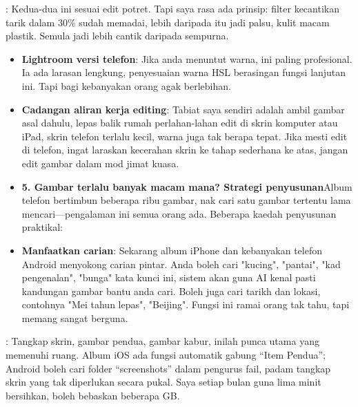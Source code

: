 
: Kedua-dua ini sesuai edit potret. Tapi saya rasa ada prinsip: filter kecantikan tarik dalam 30\% sudah memadai, lebih daripada itu jadi palsu, kulit macam plastik. Semula jadi lebih cantik daripada sempurna.

\begin{itemize}
  \item \textbf{Lightroom versi telefon}: Jika anda menuntut warna, ini paling profesional. Ia ada larasan lengkung, penyesuaian warna HSL berasingan fungsi lanjutan ini. Tapi bagi kebanyakan orang agak berlebihan.
  \item \textbf{Cadangan aliran kerja editing}: Tabiat saya sendiri adalah ambil gambar asal dahulu, lepas balik rumah perlahan-lahan edit di skrin komputer atau iPad, skrin telefon terlalu kecil, warna juga tak berapa tepat. Jika mesti edit di telefon, ingat laraskan kecerahan skrin ke tahap sederhana ke atas, jangan edit gambar dalam mod jimat kuasa.
  \item \textbf{5. Gambar terlalu banyak macam mana? Strategi penyusunan}Album telefon bertimbun beberapa ribu gambar, nak cari satu gambar tertentu lama mencari—pengalaman ini semua orang ada. Beberapa kaedah penyusunan praktikal:
  \item \textbf{Manfaatkan carian}: Sekarang album iPhone dan kebanyakan telefon Android menyokong carian pintar. Anda boleh cari "kucing", "pantai", "kad pengenalan", "bunga" kata kunci ini, sistem akan guna AI kenal pasti kandungan gambar bantu anda cari. Boleh juga cari tarikh dan lokasi, contohnya "Mei tahun lepas", "Beijing". Fungsi ini ramai orang tak tahu, tapi memang sangat berguna.
\end{itemize}


: Tangkap skrin, gambar pendua, gambar kabur, inilah punca utama yang memenuhi ruang. Album iOS ada fungsi automatik gabung “Item Pendua”; Android boleh cari folder “screenshots” dalam pengurus fail, padam tangkap skrin yang tak diperlukan secara pukal. Saya setiap bulan guna lima minit bersihkan, boleh bebaskan beberapa GB.

